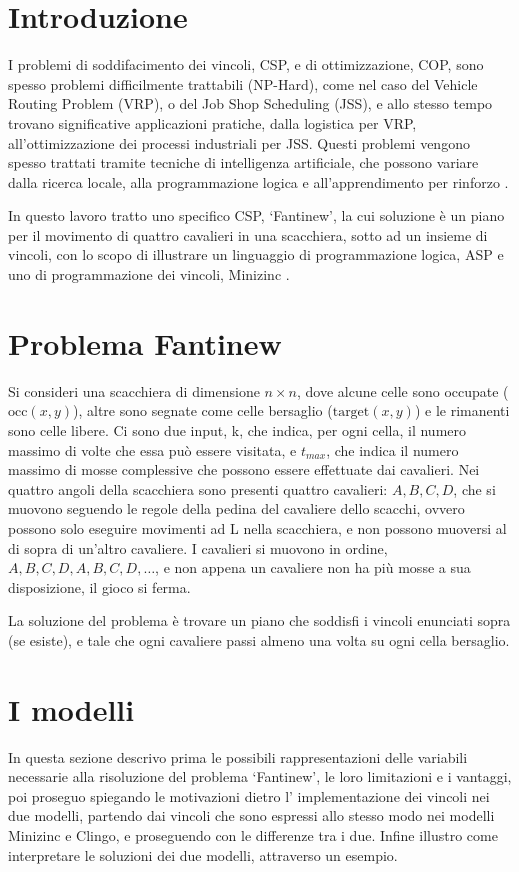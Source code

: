 \documentclass[12pt]{article}
\begin{document}
\tableofcontents

\section{Introduzione}
I problemi di soddifacimento dei vincoli, CSP, e di ottimizzazione, COP, sono spesso problemi difficilmente trattabili (NP-Hard), come nel caso del Vehicle Routing Problem (VRP), o del Job Shop Scheduling (JSS), e allo stesso tempo trovano   
significative applicazioni pratiche, dalla logistica per VRP, all'ottimizzazione dei processi industriali per JSS. 
Questi problemi vengono spesso trattati tramite tecniche di intelligenza artificiale, che possono variare dalla ricerca locale, alla programmazione logica e all'apprendimento per rinforzo \cite{cit:rl}. 

In questo lavoro tratto uno specifico CSP, ‘Fantinew’, la cui soluzione è un piano per il movimento di quattro cavalieri in una scacchiera, sotto ad un insieme di vincoli, con lo scopo di illustrare un linguaggio di programmazione logica, ASP \cite{cit:clingo} e uno di programmazione dei vincoli, Minizinc \cite{cit:minizinc}. 

\section{Problema Fantinew}
\label{sec:problem}
Si consideri una scacchiera di dimensione $n\times n$, dove alcune celle sono occupate ($\text{occ}(x,y)$), altre sono segnate come celle bersaglio ($\text{target}(x,y)$) e le rimanenti sono celle libere. 
Ci sono due input, k, che indica, per ogni cella, il numero massimo di volte che essa può essere visitata, e $t_{max}$, che indica il numero massimo di mosse complessive che possono essere effettuate dai cavalieri. 
Nei quattro angoli della scacchiera sono presenti quattro cavalieri: $A,B,C,D$, che si muovono seguendo le regole della pedina del cavaliere dello scacchi, ovvero possono solo eseguire 
movimenti ad L nella scacchiera, e non possono muoversi al di sopra di un'altro cavaliere. I cavalieri si muovono in ordine, $A,B,C,D,A,B,C,D,\dots$, e non appena un cavaliere non ha più mosse a sua disposizione, il gioco si ferma.

La soluzione del problema è trovare un piano che soddisfi i vincoli enunciati sopra (se esiste), e tale che ogni cavaliere passi almeno una volta su ogni cella bersaglio.


\section{I modelli}
In questa sezione descrivo prima le possibili rappresentazioni delle variabili necessarie alla risoluzione del problema ‘Fantinew’, le loro limitazioni e i vantaggi, poi proseguo spiegando le motivazioni dietro l'
implementazione dei vincoli nei due modelli, partendo dai vincoli che sono espressi allo stesso modo nei modelli Minizinc e Clingo, e proseguendo con le differenze tra i due. 
Infine illustro come interpretare le soluzioni dei due modelli, attraverso un esempio.
\end{document}
